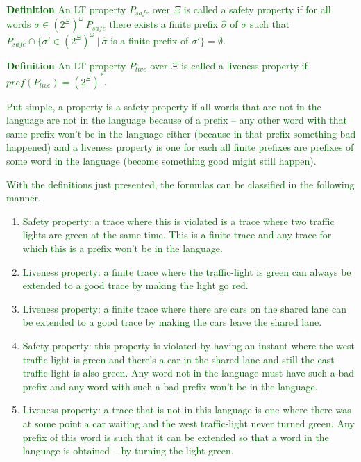 \documentclass[12pt]{article}
\newcommand{\drafter}[1]{\textcolor{darkgreen}{#1}}
\begin{document}
\begin{enumerate}[label=\roman*.]
\drafter{\textbf{Definition} An LT property $P_{safe}$ over $\Xi$ is called a safety property if for all words $\sigma \in (2^\Xi)^\omega \ P_{safe}$ there exists a finite prefix $\hat{\sigma}$ of $\sigma$ such that $P_{safe} \cap \{\sigma' \in (2^\Xi)^\omega~|~\hat{\sigma}$ is a finite prefix of $\sigma' \} = \emptyset $}.

\drafter{\textbf{Definition} An LT property $P_{live}$ over $\Xi$ is called a liveness property if $pref(P_{live}) = (2^{\Xi})^*$}.

\drafter{Put simple, a property is a safety property if all words that are not in the language are not in the language because of a prefix -- any other word with that same prefix won't be in the language either (because in that prefix something bad happened) and a liveness property is one for each all finite prefixes are prefixes of some word in the language (become something good might still happen).}

\drafter{With the definitions just presented, the formulas can be classified in the following manner.}

\begin{enumerate}[label=(\alph*)]
  \item \drafter{Safety property: a trace where this is violated is a trace where two traffic lights are green at the same time. This is a finite trace and any trace for which this is a prefix won't be in the language.}

  \item \drafter{Liveness property: a finite trace where the traffic-light is green can always be extended to a good trace by making the light go red.}

  \item \drafter{Liveness property: a finite trace where there are cars on the shared lane can be extended to a good trace by making the cars leave the shared lane.}

  \item \drafter{Safety property: this property is violated by having an instant where the west traffic-light is green and there's a car in the shared lane and still the east traffic-light is also green. Any word not in the language must have such a bad prefix and any word with such a bad prefix won't be in the language.}

  \item \drafter{Liveness property: a trace that is not in this language is one where there was at some point a car waiting and the west traffic-light never turned green. Any prefix of this word is such that it can be extended so that a word in the language is obtained -- by turning the light green.}


\end{enumerate}
\end{enumerate}
\end{document}
